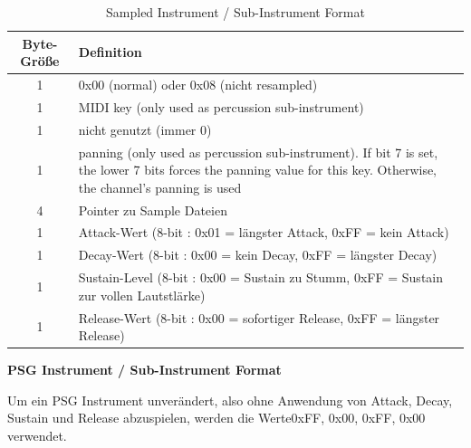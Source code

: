 \documentclass[11pt,a4paper]{scrartcl}
\newcommand{\paratitle}[1] {
    \vspace{5mm}
    \large \textbf{#1} \normalsize
    \vspace{2mm}\newline
}
\begin{document}
\begin{table}[h]
    \centering
    \begin{tabular}{ c | p{15cm} }
        \textbf{Byte-Gr\"o{\ss}e} & \textbf{Definition} \\
        \hline
				1 & 0x00 (normal) oder 0x08 (nicht resampled) \\
				\hline
        1 & MIDI key (only used as percussion sub-instrument) \\
				\hline
        1 & nicht genutzt (immer 0) \\
				\hline
        1 & panning (only used as percussion sub-instrument).
         If bit 7 is set, the lower 7 bits forces the panning value for this key. Otherwise, the channel's panning is used \\
				\hline
        4 & Pointer zu Sample Dateien \\
				\hline
				1 & Attack-Wert (8-bit : 0x01 = l\"angster Attack, 0xFF = kein Attack) \\
        \hline
        1 & Decay-Wert (8-bit : 0x00 = kein Decay, 0xFF = l\"angster Decay) \\ 
        \hline
				1 & Sustain-Level (8-bit : 0x00 = Sustain zu Stumm, 0xFF = Sustain zur vollen Lautstl\"arke) \\
        \hline
        1 & Release-Wert (8-bit : 0x00 = sofortiger Release, 0xFF = l\"angster Release) \\
    \end{tabular}
    \caption{Sampled Instrument / Sub-Instrument Format}
    \label{table:SampleInstrument}
\end{table}


\newpage
\paratitle{PSG Instrument / Sub-Instrument Format}
Um ein PSG Instrument unver\"andert, also ohne Anwendung von Attack, Decay, Sustain und Release abzuspielen, werden die Werte0xFF, 0x00, 0xFF, 0x00 verwendet.
\end{document}
